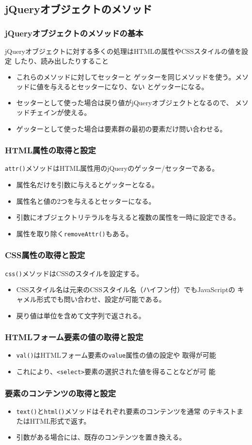 \documentclass[dvipsk]{beamer}
\begin{document}
\subsection{jQueryオブジェクトのメソッド}
\begin{frame}[containsverbatim]
\frametitle{jQueryオブジェクトのメソッドの基本}
jQueryオブジェクトに対する多くの処理はHTMLの属性やCSSスタイルの値を設定
したり、読み出したりすること
\begin{itemize}
 \item これらのメソッドに対してセッターと
ゲッターを同じメソッドを使う。メソッドに値を与えるとセッターになり、ない
とゲッターになる。
 \item セッターとして使った場合は戻り値がjQueryオブジェクトとなるので、
       メソッドチェインが使える。
 \item ゲッターとして使った場合は要素群の最初の要素だけ問い合わせる。
\end{itemize}
\end{frame}
\begin{frame}[containsverbatim]
\frametitle{HTML属性の取得と設定}
\texttt{attr()}メソッドはHTML属性用のjQueryのゲッター/セッターである。
\begin{itemize}
 \item 属性名だけを引数に与えるとゲッターとなる。
 \item 属性名と値の2つを与えるとセッターになる。
 \item 引数にオブジェクトリテラルを与えると複数の属性を一時に設定できる。
 \item 属性を取り除く\texttt{removeAttr()}もある。
\end{itemize}
\end{frame}
\begin{frame}[containsverbatim]
\frametitle{CSS属性の取得と設定}
\texttt{css()}メソッドはCSSのスタイルを設定する。
\begin{itemize}
 \item CSSスタイル名は元来のCSSスタイル名（ハイフン付）でもJavaScriptの
       キャメル形式でも問い合わせ、設定が可能である。
 \item 戻り値は単位を含めて文字列で返される。
\end{itemize}
\end{frame}
\begin{frame}[containsverbatim]
\frametitle{HTMLフォーム要素の値の取得と設定}
\begin{itemize}
 \item \texttt{val()}はHTMLフォーム要素の\texttt{value}属性の値の設定や
       取得が可能
 \item これにより、\texttt{<select>}要素の選択された値を得ることなどが可
       能
\end{itemize}
\end{frame}
\begin{frame}[containsverbatim]
\frametitle{要素のコンテンツの取得と設定}
\begin{itemize}
 \item \texttt{text()}と\texttt{html()}メソッドはそれぞれ要素のコンテンツを通常
のテキストまたはHTML形式で返す。
 \item 引数がある場合には、既存のコンテンツを置き換える。　
\end{itemize}
\end{frame}
\end{document}
